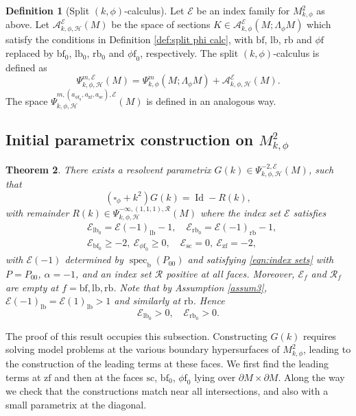 \documentclass[11pt]{article}
\newcommand{\Subsection}{\subsection}
\numberwithin{equation}{section}
\theoremstyle{plain}
\newtheorem{Th}{Theorem}[section]
\theoremstyle{definition}
\newtheorem{defn}[Th]{Definition}
\newcommand\calA{{\mathcal A}}
\newcommand\calE{{\mathcal E}}
\newcommand{\calH}{{\mathscr{H}}}
\newcommand\calR{{\mathcal R}}
\newcommand{\phif}{{\phi\mathrm{f}}}
\newcommand{\lf}{{\mathrm{lb}}}
\newcommand{\rf}{{\mathrm{rb}}}
\newcommand{\bb}{{\mathrm{b}}}
\newcommand{\lfz}{{\mathrm{lb}_0}}
\newcommand{\rfz}{{\mathrm{rb}_0}}
\newcommand{\bbf}{{\mathrm{bf}}}
\newcommand{\bbfz}{{\bbf_0}}
\newcommand{\ssc}{{\mathrm{sc}}}
\newcommand{\zf}{{\mathrm{zf}}}
\DeclareMathOperator{\Id}{Id}
\DeclareMathOperator\spec{spec}
\begin{document}
\begin{defn}[Split $(k,\phi)$-calculus]\label{def:split k phi calculus}
Let $\calE$ be an index family for $M^2_{k,\phi}$ as above.
Let $\calA^\calE_{k,\phi,\mathscr{H}}(M)$ be the space of sections $K\in \calA^{\calE}_{k,\phi}(M;\Lambda_\phi M)$ which satisfy the conditions in Definition \ref{def:split phi calc}, with $\bbf$, $\lf$, $\rf$ and $\phif$ replaced by $\bbf_0$, $\lf_0$, $\rf_0$ and
$\phif_0$, respectively. The split $(k,\phi)$-calculus is defined as
\[
\Psi^{m,\calE}_{k,\phi,\mathscr{H}}(M) = \Psi^{m}_{k,\phi}(M;\Lambda_\phi M) +
\calA^\calE_{k,\phi,\mathscr{H}}(M).
\]
The space $\Psi_{k,\phi,\calH}^{m,(a_{\phif_0}, a_\zf,a_\ssc),\calE}(M)$ is defined in an analogous way.

\end{defn}

\Subsection{Initial parametrix construction on $M^{2}_{k,\phi}$}
\label{subsec:intl param}

\begin{Th}\label{initial resl phi}
There exists a resolvent parametrix $G(k)\in \Psi^{-2,\calE}_{k,\phi,\mathscr{H}}(M)$,
such that
\[
(\square_\phi+k^2) G(k) = \Id - R(k),
\]
with remainder $R(k)\in \Psi^{-\infty,(1,1,1),\calR}_{k,\phi,\mathscr{H}}(M)$
where the index set $\calE$ satisfies
\begin{equation}
\label{eqn:ind set k phi para}
\begin{split}
&\calE_{\lfz}=\calE(-1)_\lf-1,\quad \calE_\rfz=\calE(-1)_\rf-1,
\\ &\calE_\bbfz\geq-2,\ \calE_{\phif_0}\geq0,\quad \calE_\ssc=0,\ \calE_\zf=-2,
\end{split}
\end{equation}
with $\calE(-1)$ determined by $\spec_\bb(P_{00})$ and satisfying \eqref{eqn:index sets}
with $P=P_{00}$, $\alpha=-1$, and an index set $\calR$ positive at all faces.
Moreover, $\calE_f$ and $\calR_f$ are empty at $f=\bbf,\lf,\rf$. Note that by Assumption
\ref{assum3}, $\calE(-1)_\lf= \calE(1)_\lf > 1$ and similarly at $\rf$. Hence
\begin{equation}
\label{eqn: lf rf positive}
\calE_{\lfz}>0,\quad \calE_\rfz>0.
\end{equation}

\end{Th}

The proof of this result occupies this subsection.
Constructing $G(k)$ requires solving model problems at the various boundary
hypersurfaces of $M^2_{k,\phi}$, leading to the construction of the leading terms at these faces.
We first find the leading terms at $\zf$ and then at the faces $\ssc$, $\bbf_0$, $\phif_0$ lying over $\partial M\times\partial M$. Along the way we check that the constructions match near all intersections, and also with a small parametrix at the diagonal.
\end{document}
